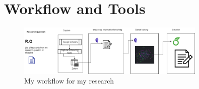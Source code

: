 \section{Workflow and Tools}

\begin{figure}[H]
    \centering
    \includegraphics[width=0.8\textwidth]{images/Untitled Diagram.drawio.png}
    \caption{My workflow for my research}
    \label{fig:test_results}
\end{figure}